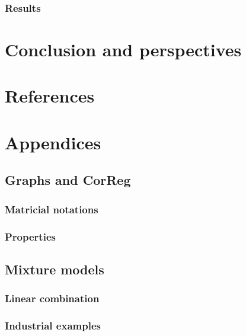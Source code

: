 \documentclass[11pt,a4paper]{report}
\begin{document}
		\subsection{Results}
\chapter{Conclusion and perspectives}
\chapter{References}
{ }

\chapter{Appendices}
	\section{Graphs and CorReg}
		\subsection{Matricial notations}
		\subsection{Properties}
	\section{Mixture models}
		\subsection{Linear combination}
		\subsection{Industrial examples}	
\end{document}
